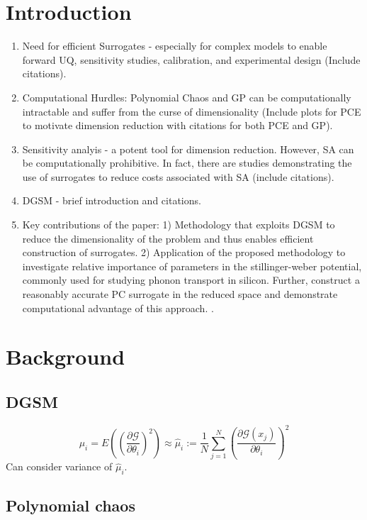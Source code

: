 \documentclass[letter,12pt]{article}
\begin{document}


\tableofcontents

\section{Introduction}
\begin{enumerate}
\item Need for efficient Surrogates - especially for complex models to enable forward UQ, 
sensitivity studies, calibration, and experimental design (Include citations).
\item Computational Hurdles: Polynomial Chaos and GP can be computationally 
intractable and suffer from the curse of dimensionality (Include plots for PCE
to motivate dimension reduction with citations for both PCE and GP).
\item Sensitivity analyis - a potent tool for dimension reduction. However, SA can be
computationally prohibitive. In fact, there are studies demonstrating the use of 
surrogates to reduce costs associated with SA (include citations). 
\item DGSM - brief introduction and citations. 
\item Key contributions of the paper: 1) Methodology that exploits DGSM to reduce the
dimensionality of the problem and thus enables efficient construction of surrogates.
2) Application of the proposed methodology to investigate relative importance of
parameters in the stillinger-weber potential, commonly used for studying phonon transport in silicon. Further, construct a reasonably accurate PC surrogate in the reduced 
space and demonstrate computational advantage of this approach. .
\end{enumerate}

\section{Background}
\subsection{DGSM}
\[ 
    \mu_i = E\left(\left( \frac{\partial \mathcal{G}}{\partial \theta_i}\right)^2\right)
          \approx \hat\mu_i := \frac1N\sum_{j = 1}^N 
                  \left(\frac{\partial \mathcal{G}(x_j)}{\partial \theta_i}\right)^2
\]
Can consider variance of $\hat\mu_i$.

\subsection{Polynomial chaos}
\end{document}
